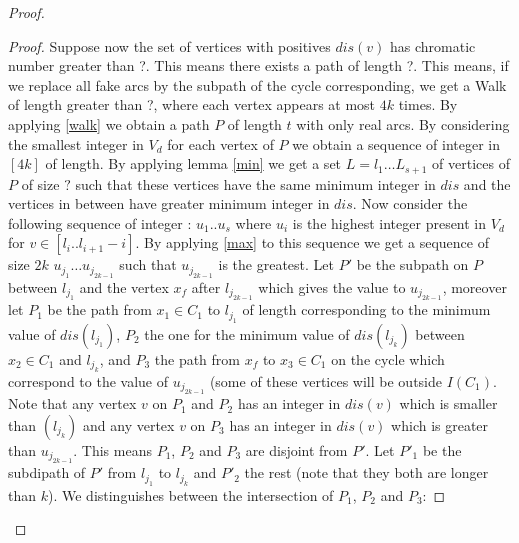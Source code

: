 \documentclass[10pt]{article}
\theoremstyle{plain}
\theoremstyle{definition}
\theoremstyle{remark}
\begin{document}
\begin{proof}
\begin{proof}



Suppose now the set of vertices with positives $dis(v)$ has chromatic number greater than ?. This means there exists a path of length ?. This means,
if we replace all fake arcs by the subpath of the cycle corresponding, we get a Walk of length greater than ?, where each vertex appears at most
$4k$ times. By applying \ref{walk} we obtain a path $P$ of length $t$ with only real arcs. By considering the smallest integer in $V_d$ for each vertex
of $P$ we obtain a sequence of integer in $[4k]$ of length. 
By applying lemma \ref{min} we get a set $L = l_1 \dots L_{s+1}$ of vertices of $P$ of size $?$ such that these 
vertices have the same minimum integer in $dis$ and the vertices in between have greater minimum integer in $dis$. 
Now consider the following sequence of integer : $u_1 .. u_s$ where $u_i$ is the highest integer present in $V_d$ for $v \in [l_i .. l_{i+1} - i]$. 
By applying \ref{max} to this sequence we get a sequence of size $2k$ $u_{j_1} \dots u_{j_{2k-1}}$ such that $u_{j_{2k-1}}$ is the greatest.
Let $P'$ be the subpath on $P$ between $l_{j_1}$ and the vertex $x_f$ after $l_{j_{2k-1}}$ which gives the value to $u_{j_{2k-1}}$, moreover let $P_1$ 
be the path from $x_1 \in C_1$ to $l_{j_1}$ of length corresponding to the minimum value of $dis(l_{j_1})$, $P_2$ the one for the minimum 
value of $dis(l_{j_k})$ between $x_2 \in C_1$ and $l_{j_k}$, and $P_3$ the path from $x_f$ to $x_3 \in C_1$ on the cycle which correspond to the 
value of $u_{j_{2k-1}}$ (some of these vertices will be outside $I(C_1)$. Note that any vertex $v$ on $P_1$ and $P_2$ has an integer in $dis(v)$ 
which is smaller than $(l_{j_k})$ and any vertex $v$ on $P_3$ has an integer in $dis(v)$ which is greater than $u_{j_{2k-1}}$. This means 
$P_1$, $P_2$ and $P_3$ are disjoint from $P'$. Let $P'_1$ be the subdipath of $P'$ from $l_{j_1}$ to $l_{j_k}$ and  $P'_2$ the rest
(note that they both are longer than $k$). 
We distinguishes between the intersection of $P_1$, $P_2$ and $P_3$:


\end{proof}
\end{proof}
\end{document}
